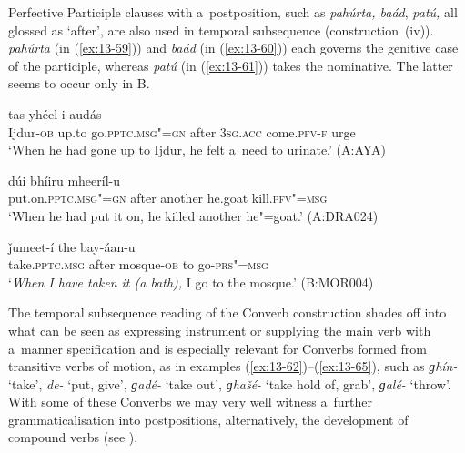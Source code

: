 Perfective Participle clauses with a~postposition, such as \textit{pahúrta, baád}, \textit{patú,} all glossed as `after', are also used in temporal subsequence (construction~(iv)). \textit{pahúrta} (in (\ref{ex:13-59})) and \textit{baád} (in (\ref{ex:13-60})) each governs the genitive case of the participle, whereas \textit{patú} (in (\ref{ex:13-61})) takes the nominative. The latter seems to occur only in B. 

\begin{exe}
\ex
\label{ex:13-59}
\gll [iẓḍúur-a ǰe ɡúum"=ii pahúrta] tas yhéel-i audás \\
Ijdur-\textsc{ob} up.to go.\textsc{pptc.msg"=gn} after \textsc{3sg.acc} come.\textsc{pfv-f} urge \\
\glt `When he had gone up to Ijdur, he felt a~need to urinate.' (A:AYA)

\ex
\label{ex:13-60}
\gll [ṣaawóol"=ii baád] dúi bhíiru mheeríl-u \\
put.on.\textsc{pptc.msg"=gn} after another he.goat kill.\textsc{pfv"=msg}  \\
\glt `When he had put it on, he killed another he"=goat.' (A:DRA024)

\ex
\label{ex:13-61}
 ǰumeet-í the bay-áan-u  \\
take.\textsc{pptc.msg} after mosque-\textsc{ob} to go-\textsc{prs"=msg} \\
\glt `\textit{When I have taken it (a bath),} I go to the mosque.' (B:MOR004) 
\end{exe}

 The temporal subsequence reading of the Converb construction shades off into what can be seen as expressing instrument or supplying the main verb with a~manner specification and is especially relevant for Converbs formed from transitive verbs of motion, as in examples (\ref{ex:13-62})--(\ref{ex:13-65}), such as \textit{ɡhín-} `take', \textit{de-} `put, give', \textit{ɡaḍé-} `take out', \textit{ɡhašé-} `take hold of, grab', \textit{ɡalé-} `throw'. With some of these Converbs we may very well witness a~further grammaticalisation into postpositions, alternatively, the development of compound verbs (see ). 


